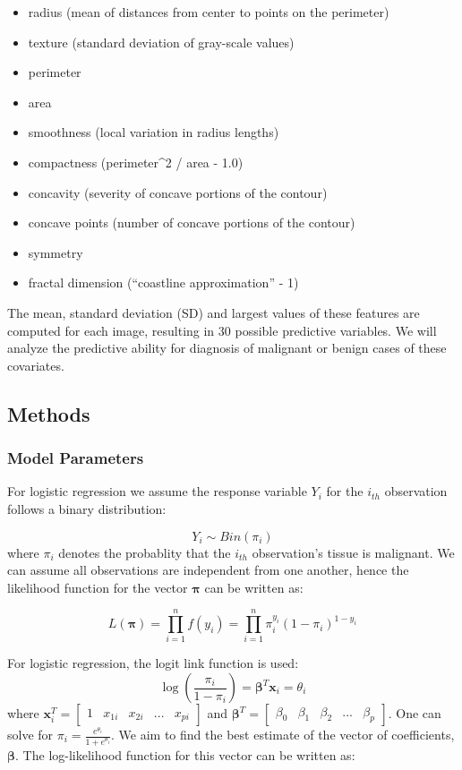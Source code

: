\documentclass[]{article}
\providecommand{\tightlist}{%
  \setlength{\itemsep}{0pt}\setlength{\parskip}{0pt}}
\begin{document}
\begin{itemize}
\tightlist
\item
  radius (mean of distances from center to points on the perimeter)
\item
  texture (standard deviation of gray-scale values)
\item
  perimeter
\item
  area
\item
  smoothness (local variation in radius lengths)
\item
  compactness (perimeter\^{}2 / area - 1.0)
\item
  concavity (severity of concave portions of the contour)
\item
  concave points (number of concave portions of the contour)
\item
  symmetry
\item
  fractal dimension (``coastline approximation'' - 1)
\end{itemize}

The mean, standard deviation (SD) and largest values of these features
are computed for each image, resulting in 30 possible predictive
variables. We will analyze the predictive ability for diagnosis of
malignant or benign cases of these covariates.

\hypertarget{methods}{%
\subsection{Methods}\label{methods}}

\hypertarget{model-parameters}{%
\subsubsection{Model Parameters}\label{model-parameters}}

For logistic regression we assume the response variable \(Y_i\) for the
\(i_{th}\) observation follows a binary distribution:

\[Y_i\sim Bin(\pi_i)\] where \(\pi_i\) denotes the probablity that the
\(i_{th}\) observation's tissue is malignant. We can assume all
observations are independent from one another, hence the likelihood
function for the vector \(\boldsymbol\pi\) can be written as:

\[L(\boldsymbol\pi)=\prod_{i=1}^n f(y_i)=\prod_{i=1}^n\pi_i^{y_i}(1 - \pi_i)^{1-y_i}\]

For logistic regression, the logit link function is used:
\[\log(\frac{\pi_i}{1-\pi_i}) = \boldsymbol \beta ^T\boldsymbol x_i = \theta_i\]
where
\(\boldsymbol x_i^T = \begin{bmatrix} 1 & x_{1i} &x_{2i} & ... & x_{pi} \end{bmatrix}\)
and
\(\boldsymbol \beta^T = \begin{bmatrix} \beta_0 & \beta_1 & \beta_2 & ... & \beta_p \end{bmatrix}\).
One can solve for \(\pi_i = \frac{e^{\theta_i}}{1 + e^{\theta_i}}\). We
aim to find the best estimate of the vector of coefficients,
\(\boldsymbol \beta\). The log-likelihood function for this vector can
be written as:
\end{document}

